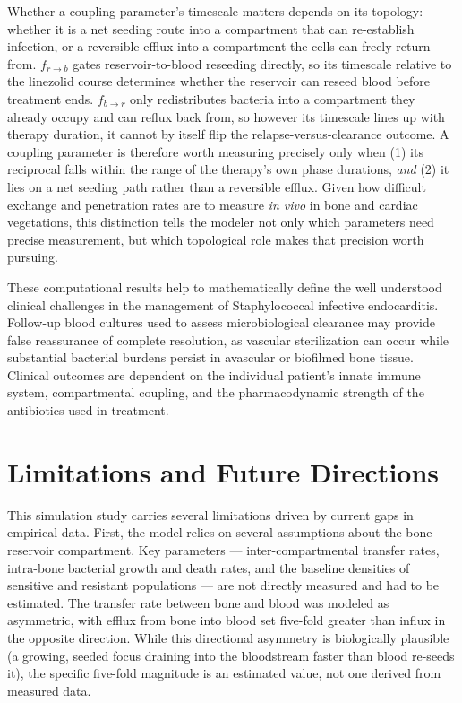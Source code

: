 \documentclass[12pt, draftcls, onecolumn]{IEEEtran}
\begin{document}
Whether a coupling parameter's timescale matters depends on its topology:
whether it is a net seeding route into a compartment that can re-establish
infection, or a reversible efflux into a compartment the cells can freely
return from. $f_{r \to b}$ gates reservoir-to-blood reseeding directly, so
its timescale relative to the linezolid course determines whether the
reservoir can reseed blood before treatment ends. $f_{b \to r}$ only
redistributes bacteria into a compartment they already occupy and can
reflux back from, so however its timescale lines up with therapy duration,
it cannot by itself flip the relapse-versus-clearance outcome. A coupling
parameter is therefore worth measuring precisely only when (1) its
reciprocal falls within the range of the therapy's own phase durations,
\emph{and} (2) it lies on a net seeding path rather than a reversible
efflux. Given how difficult exchange and penetration rates are to measure
\emph{in vivo} in bone and cardiac vegetations, this distinction tells the
modeler not only which parameters need precise measurement, but which
topological role makes that precision worth pursuing.


These computational results help to mathematically define the well
understood clinical challenges in the management of Staphylococcal
infective endocarditis. Follow-up blood cultures used to assess
microbiological clearance may provide false reassurance of complete
resolution, as vascular sterilization can occur while substantial bacterial
burdens persist in avascular or biofilmed bone tissue. Clinical outcomes
are dependent on the individual patient's innate immune system,
compartmental coupling, and the pharmacodynamic strength of the antibiotics
used in treatment.

\section{Limitations and Future Directions}

This simulation study carries several limitations driven by current gaps
in empirical data.
 First, the model relies on several assumptions about the bone reservoir
compartment. Key parameters --- inter-compartmental transfer rates,
intra-bone bacterial growth and death rates, and the baseline densities of
sensitive and resistant populations --- are not directly measured and had
to be estimated. The transfer rate between bone and blood was modeled as
asymmetric, with efflux from bone into blood set five-fold greater than
influx in the opposite direction. While this directional asymmetry is
biologically plausible (a growing, seeded focus draining into the
bloodstream faster than blood re-seeds it), the specific five-fold
magnitude is an estimated value, not one derived from measured data.
\end{document}

